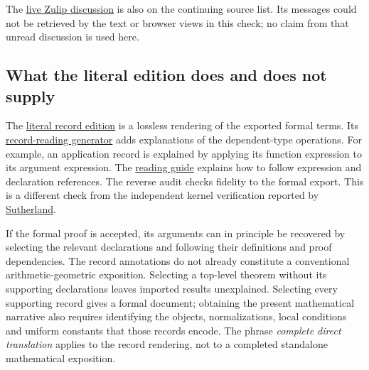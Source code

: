 The
\href{https://leanprover.zulipchat.com/#narrow/channel/113488-general/topic/Discussion.3A.20Alp.C3.B6ge.20Proves.20the.20Riemann.20Hypothesis/near/642250042}{live Zulip discussion}
is also on the continuing source list. Its messages could not be
retrieved by the text or browser views in this check; no claim from
that unread discussion is used here.

\subsection{What the literal edition does and does not supply}
\label{sec:sr-literal-selection}
The
\href{https://github.com/ChristianKudeba/alpoge-rh-verification/releases/tag/rh-literal-audit-v1}{literal record edition}
is a lossless rendering of the exported formal terms.
Its
\href{https://github.com/ChristianKudeba/alpoge-rh-verification/blob/f26c24148d4ac31a9e40fd91a97779bbb8ea20fd/translation/kernel/prose_records.py}{record-reading generator}
adds explanations of the dependent-type operations.
For example, an application record is explained by applying its
function expression to its argument expression.
The
\href{https://github.com/ChristianKudeba/alpoge-rh-verification/blob/f26c24148d4ac31a9e40fd91a97779bbb8ea20fd/translation/kernel/reading.md}{reading guide}
explains how to follow expression and declaration references.
The reverse audit checks fidelity to the formal export.
This is a different check from the independent kernel verification
reported by
\href{https://math.mit.edu/~drew/grh/}{Sutherland}.

If the formal proof is accepted, its arguments can in principle be
recovered by selecting the relevant declarations and following their
definitions and proof dependencies.
The record annotations do not already constitute a conventional
arithmetic-geometric exposition.
Selecting a top-level theorem without its supporting declarations
leaves imported results unexplained.
Selecting every supporting record gives a formal document; obtaining
the present mathematical narrative also requires identifying the
objects, normalizations, local conditions and uniform constants
that those records encode.
The phrase \emph{complete direct translation} applies to the record
rendering, not to a completed standalone mathematical exposition.

